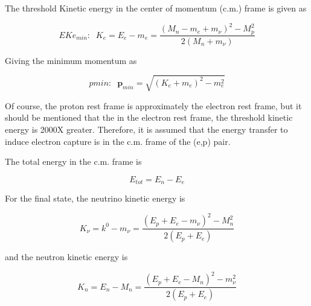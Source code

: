 \documentclass[11pt]{amsart}
\begin{document}
The threshold Kinetic energy in the center of momentum (c.m.) frame is given as

$$EKe_{min}:\;\;K_{e}=E_{e}-m_{e}=\dfrac{(M_{n}-m_{e}+m_{\nu})^{2}-M^{2}_{p}}{2(M_{n}+m_{\nu})}$$
 
Giving the minimum momentum as

$$pmin:\;\;\mathbf{p}_{min}=\sqrt{(K_{e}+m_{e})^{2}-m_{e}^{2}} $$

Of course, the proton rest frame is approximately the electron rest frame, but it should be mentioned that the in the electron rest frame, the threshold kinetic energy is 2000X greater.  Therefore, it is assumed that the energy transfer to induce electron capture is in the c.m. frame of the (e,p) pair.

The total energy in the c.m. frame is

$$E_{tot}=E_{n}-E_{e}$$

For the final state, the neutrino kinetic energy is

$$K_{\nu}=k^{0}-m_{\nu}=\dfrac{(E_{p}+E_{e}-m_{\nu})^{2}-M^{2}_{n}}{2(E_{p}+E_{e})}$$

and the neutron kinetic energy is

$$K_{n}=E_{n}-M_{n}=\dfrac{(E_{p}+E_{e}-M_{n})^{2}-m^{2}_{\nu}}{2(E_{p}+E_{e})}$$
\end{document}
